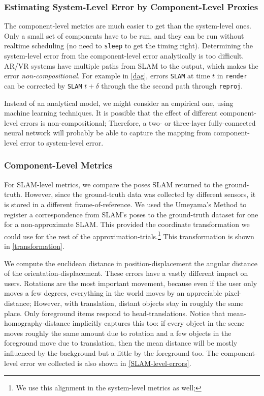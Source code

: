 \subsubsection{Estimating System-Level Error by Component-Level Proxies}

The component-level metrics are much easier to get than the system-level ones.
Only a small set of components have to be run, and they can be run without realtime scheduling (no need to \verb+sleep+ to get the timing right).
Determining the system-level error from the component-level error analytically is too difficult.
AR/VR systems have multiple paths from SLAM to the output, which makes the error \textit{non-compositional}.
For example in \cref{dag}, errors \verb+SLAM+ at time \(t\) in \verb+render+ can be corrected by \verb+SLAM+ \(t+\delta\) through the the second path through \verb+reproj+.

Instead of an analytical model, we might consider an empirical one, using machine learning techniques.
It is possible that the effect of different component-level errors is non-compositional;
Therefore, a two- or three-layer fully-connected neural network will probably be able to capture the mapping from component-level error to system-level error.

\subsubsection{Component-Level Metrics}

For SLAM-level metrics, we compare the poses SLAM returned to the ground-truth.
However, since the ground-truth data was collected by different sensors, it is stored in a different frame-of-reference.
We used the Umeyama's Method to register a correspondence from SLAM's poses to the ground-truth dataset for one for a non-approximate SLAM\cite{88573}.
This provided the coordinate transformation we could use for the rest of the approximation-trials.\footnote{We use this alignment in the system-level metrics as well; }
This transformation is shown in \cref{transformation}.

We compute the euclidean distance in position-displacement the angular distance of the orientation-displacement.
These errors have a vastly different impact on users.
Rotations are the most important movement, because even if the user only moves a few degrees, everything in the world moves by an appreciable pixel-distance;
However, with translation, distant objects stay in roughly the same place. Only foreground items respond to head-translations.
Notice that mean-homography-distance implicitly captures this too:
if every object in the scene moves roughly the same amount due to rotation and a few objects in the foreground move due to translation, then the mean distance will be mostly influenced by the background but a little by the foreground too.
The component-level error we collected is also shown in \cref{SLAM-level-errors}.
